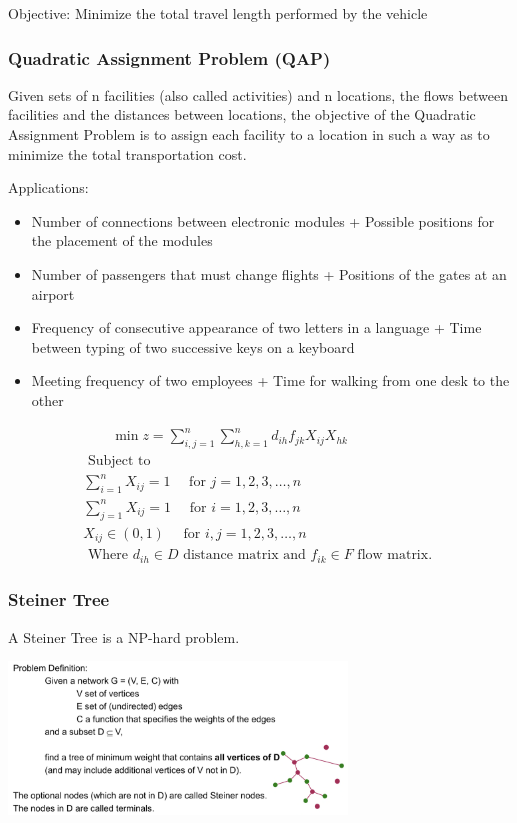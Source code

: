 \documentclass[10pt,a4paper,twocolumn]{article}
\begin{document}
Objective: Minimize the total travel length performed by the vehicle

\subsubsection{Quadratic Assignment Problem (QAP)}
Given sets of n facilities (also called activities) and n locations, the flows between facilities and the distances between locations, the objective of the Quadratic Assignment Problem is to assign each facility to a location in such a way as to minimize the total transportation cost.

Applications:
\begin{itemize}
	\item Number of connections between electronic modules + Possible positions for the placement of the modules
	\item Number of passengers that must change flights + Positions of the gates at an airport
	\item Frequency of consecutive appearance of two letters in a language + Time between typing of two successive keys on a keyboard
	\item Meeting frequency of two employees + Time for walking from one desk to the other
\end{itemize}

$$
\begin{array}{l}\qquad \min z=\sum_{i, j=1}^{n} \sum_{h, k=1}^{n} d_{i h} f_{j k} X_{i j} X_{h k} \\ \text { Subject to } \\ \sum_{i=1}^{n} X_{i j}=1 \quad \text { for } j=1,2,3, \ldots, n \\ \sum_{j=1}^{n} X_{i j}=1 \quad \text { for } i=1,2,3, \ldots, n \\ X_{i j} \in(0,1) \quad \text { for } i, j=1,2,3, \ldots, n \\ \text { Where } d_{i h} \in D \text { distance matrix and } f_{i k} \in F \text { flow matrix. }\end{array}
$$

\subsubsection{Steiner Tree}
A Steiner Tree is a NP-hard problem.
\begin{center}
	\includegraphics[width=9cm]{images/steiner-tree}
\end{center}
\end{document}
